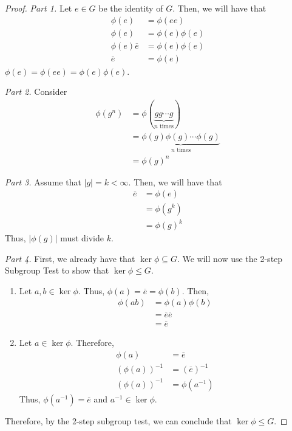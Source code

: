\begin{proof}
    \phantom{gg}

    \textit{Part 1.} Let \(e \in G\) be the identity of \(G\). Then, we will have that
    \[
    \begin{aligned}
        \phi(e) &= \phi(e e) \\
        \phi(e) &= \phi(e) \phi(e) \\
        \phi(e)\overline{e} &= \phi(e)\phi(e) \\
        \overline{e} &= \phi(e)
    \end{aligned}
    \]
    \(\phi(e) = \phi(e e) = \phi(e)\phi(e)\).

    \textit{Part 2.} Consider
    \[
    \begin{aligned}
        \phi(g^n) &= \phi(\underbrace{g g \cdots g}_\text{\(n\) times}) \\
                  &= \underbrace{\phi(g) \phi(g) \cdots \phi(g)}_\text{\(n\) times} \\
                  &= \phi(g)^n
    \end{aligned}
    \]

    \textit{Part 3.} Assume that \(|g| = k < \infty\). Then, we will have that
    \[
    \begin{aligned}
        \overline{e} &= \phi(e) \\
                     &= \phi(g^k) \\
                     &= \phi(g)^k
    \end{aligned}
    \]
    Thus, \(|\phi(g)|\) must divide \(k\).

    \textit{Part 4.} First, we already have that \(\ker\phi \subseteq G\). We will now use the 2-step Subgroup Test to show that \(\ker\phi \leq G\).
    \begin{enumerate}
        \item Let \(a, b \in \ker\phi\). Thus, \(\phi(a) = \overline{e} = \phi(b)\). Then, 
            \[
            \begin{aligned}
                \phi(ab) &= \phi(a) \phi(b) \\
                         &= \overline{e} \overline{e} \\
                         &= \overline{e}
            \end{aligned}
            \]
        \item Let \(a \in \ker\phi\). Therefore,
            \[
            \begin{aligned}
                \phi(a) &= \overline{e} \\
                (\phi(a))^{-1} &= (\overline{e})^{-1} \\
                (\phi(a))^{-1} &= \phi(a^{-1})
            \end{aligned}
            \]
            Thus, \(\phi(a^{-1}) = \overline{e}\) and \(a^{-1} \in \ker\phi\).
    \end{enumerate}
        Therefore, by the 2-step subgroup test, we can conclude that \(\ker\phi \leq G\).
\end{proof}

